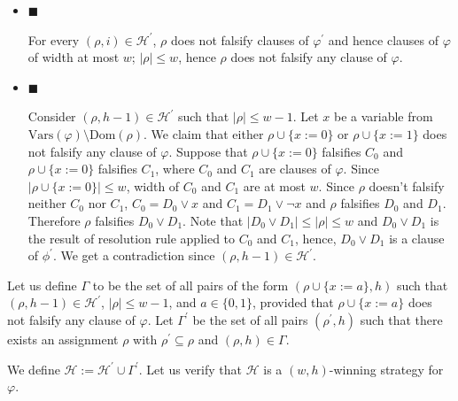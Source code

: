\begin{itemize}


\item 
$\blacksquare$ 


For every $(\rho,i)\in\mathcal{H^{\prime}}$, $\rho$ does not falsify clauses of $\varphi^{\prime}$ and hence clauses of $\varphi$
of width at most $w$; $|\rho|\leq w$, hence $\rho$ does not falsify any clause of $\varphi$.\par





\item 
$\blacksquare$ 


Consider $(\rho,h-1)\in\mathcal{H^{\prime}}$ such that $|\rho|\leq w-1$. Let $x$ be a variable from $\mathrm{Vars}(\varphi)\setminus\mathrm{Dom}(\rho)$.
We claim that either $\rho\cup\{x:=0\}$ or $\rho\cup\{x:=1\}$ does not falsify any clause of $\varphi$.
Suppose that $\rho\cup\{x:=0\}$ falsifies $C_{0}$ and $\rho\cup\{x:=0\}$ falsifies $C_{1}$, where $C_{0}$ and $C_{1}$ are clauses of $\varphi$.
Since $|\rho\cup\{x:=0\}|\leq w$, width of $C_{0}$ and $C_{1}$ are at most $w$.
Since $\rho$ doesn’t falsify neither $C_{0}$ nor $C_{1}$,
$C_{0}=D_{0}\lor x$ and $C_{1}=D_{1}\lor\lnot x$ and $\rho$ falsifies $D_{0}$ and $D_{1}$.
Therefore $\rho$ falsifies $D_{0}\lor D_{1}$.
Note that $|D_{0}\lor D_{1}|\leq|\rho|\leq w$ and $D_{0}\lor D_{1}$ is the result of resolution rule applied to $C_{0}$ and $C_{1}$,
hence, $D_{0}\lor D_{1}$ is a clause of $\phi^{\prime}$.
We get a contradiction since $(\rho,h-1)\in\mathcal{H^{\prime}}$.\par





\end{itemize}


Let us define $\Gamma$ to be the set of all pairs of the form $(\rho\cup\{x:=a\},h)$ such that
$(\rho,h-1)\in\mathcal{H^{\prime}}$, $|\rho|\leq w-1$, and $a\in\{0,1\}$, provided that $\rho\cup\{x:=a\}$
does not falsify any clause of $\varphi$.
Let $\Gamma^{\prime}$ be the set of all pairs $(\rho^{\prime},h)$ such that there exists an assignment
$\rho$ with $\rho^{\prime}\subseteq\rho$ and $(\rho,h)\in\Gamma$.\par



We define $\mathcal{H}:=\mathcal{H^{\prime}}\cup\Gamma^{\prime}$.
Let us verify that $\mathcal{H}$ is a $(w,h)$-winning strategy for $\varphi$.\par


